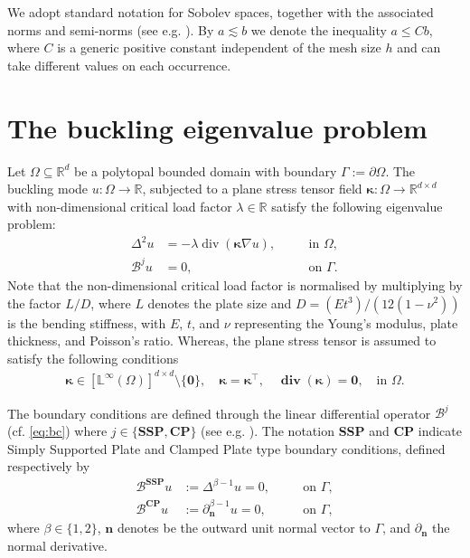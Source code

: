 \documentclass[final,reqno]{elsarticle}
\def\bbL{\mathbb{L}}
\newcommand\vdiv{\mathop{\mathrm{div}}\nolimits}
\newcommand\bdiv{\mathop{\mathbf{div}}\nolimits}
\def\bn{\boldsymbol{n}}
\def\bkappa{\boldsymbol{\kappa}}
\def\bzero{\boldsymbol{0}}
\begin{document}
We adopt standard notation for Sobolev spaces, together with the associated norms and semi-norms (see e.g. \cite{adams2003sobolev}). By $a \lesssim b$ we denote the inequality $a\leq C b$, where $C$ is a generic positive constant independent of the mesh size $h$ and can take different values on each occurrence. 

\section{The buckling eigenvalue problem}\label{sec:main_problem} Let $\Omega\subseteq \mathbb{R}^d$ be a polytopal bounded domain with boundary $\Gamma:=\partial \Omega$. The buckling mode $u:\Omega\rightarrow \mathbb{R}$, subjected to a plane stress tensor field $\bkappa : \Omega \rightarrow \mathbb{R}^{d\times d}$ with non-dimensional critical load factor $\lambda\in \mathbb{R}$ satisfy the following eigenvalue problem:
\begin{subequations}\label{eq:MPr}
    \begin{alignat}{2}
      \Delta^2 u &= -\lambda \vdiv (\bkappa\nabla u), \quad && \text{in } \Omega, \label{eq:balance}\\
      \mathcal{B}^{j}u &= 0,\quad  && \text{on } \Gamma. \label{eq:bc}
    \end{alignat}
\end{subequations}
Note that the non-dimensional critical load factor is normalised by multiplying by the factor $L/D$, where $L$ denotes the plate size and $D=(Et^{3})/(12(1-\nu^{2}))$ is the bending stiffness, with $E$, $t$, and $\nu$ representing the Young’s modulus, plate thickness, and Poisson’s ratio. Whereas, the plane stress tensor is assumed to satisfy the following conditions
\begin{align*}
    \bkappa \in [\bbL^\infty(\Omega)]^{d\times d}\setminus\{\bzero\}, \quad \bkappa = \bkappa^{\top}, \quad \bdiv(\bkappa) = \bzero, \quad \text{in } \Omega.
\end{align*}

The boundary conditions are defined through the linear differential operator $\mathcal{B}^{j}$ (cf. \eqref{eq:bc}) where $j\in\{\textbf{SSP},\textbf{CP}\}$ (see e.g. \cite[Section~2.3]{gazzola}). The notation \textbf{SSP} and \textbf{CP} indicate Simply Supported Plate and Clamped Plate type boundary conditions, defined respectively by 
\begin{subequations}
    \begin{alignat}{2}
        \mathcal{B}^{\textbf{SSP}}u&:=\Delta^{\beta-1}u=0,\quad &&\mbox{on }\Gamma,\label{eq:SSP}\\
        \mathcal{B}^{\textbf{CP}}u&:=\partial_{\bn}^{\beta-1}u=0,\quad &&\mbox{on }\Gamma,\label{eq:CP}
    \end{alignat}      
\end{subequations}
where $\beta \in \{1,2\}$, $\bn$ denotes be the outward unit normal vector to $\Gamma$, and $\partial_{\boldsymbol{n}}$ the normal derivative.
\end{document}
